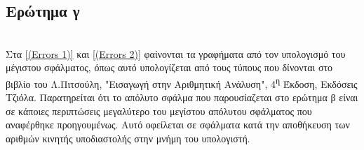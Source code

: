 \documentclass{article}
\begin{document}
\vspace*{\fill}
\subsection{Ερώτημα γ}
\noindent
\\
Στα \autoref{(Errors 1)} και \autoref{(Errors 2)} φαίνονται τα γραφήματα από τον υπολογισμό του μέγιστου σφάλματος, όπως αυτό υπολογίζεται από τους τύπους που δίνονται στο βιβλίο του Λ.Πιτσούλη, "Εισαγωγή στην Αριθμητική Ανάλυση", 4\textsuperscript{η} Έκδοση, Εκδόσεις Τζιόλα. Παρατηρείται ότι το απόλυτο σφάλμα που παρουσίαζεται στο ερώτημα β είναι σε κάποιες περιπτώσεις μεγαλύτερο του μεγίστου απόλυτου σφάλματος που αναφέρθηκε προηγουμένως. Αυτό οφείλεται σε σφάλματα κατά την αποθήκευση των αριθμών κινητής υποδιαστολής στην μνήμη του υπολογιστή.

\vspace*{\fill}
\end{document}
